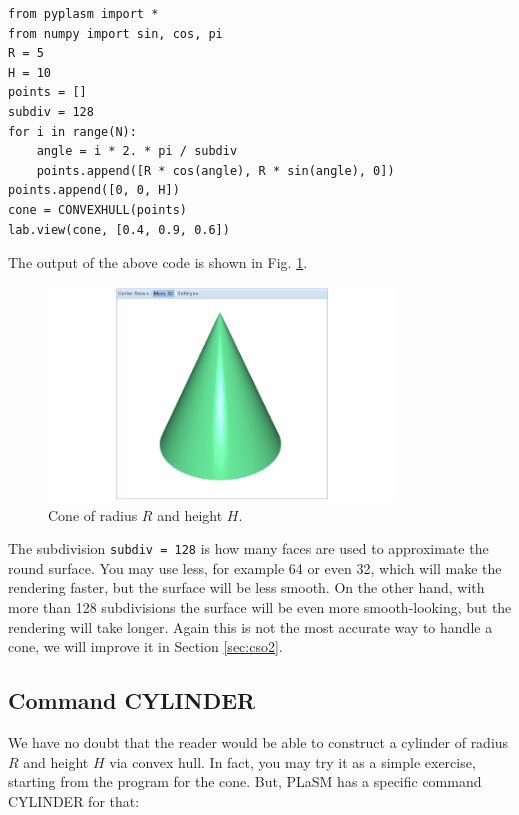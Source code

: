 \documentclass[article,A4,12pt]{llncs}
\begin{document}
{\small
\begin{verbatim}
from pyplasm import *
from numpy import sin, cos, pi
R = 5
H = 10
points = []
subdiv = 128
for i in range(N):
    angle = i * 2. * pi / subdiv
    points.append([R * cos(angle), R * sin(angle), 0])
points.append([0, 0, H])
cone = CONVEXHULL(points)
lab.view(cone, [0.4, 0.9, 0.6])
\end{verbatim}
}
\noindent
The output of the above code is shown in Fig. \ref{fig:convexhull-2}.

\begin{figure}[!ht]
\begin{center}
\includegraphics[width=0.82\textwidth]{img/convexhull-2.png}
\end{center}
\vspace{-2mm}
\caption{Cone of radius $R$ and height $H$.}
\label{fig:convexhull-2}
\end{figure}

The subdivision {\tt subdiv = 128} is how many
faces are used to approximate the round surface. You may use less, 
for example 64 or even 32, which will make the rendering faster, but
the surface will be less smooth. On the other hand, with more than 
128 subdivisions the surface will be even more smooth-looking, but 
the rendering will take longer. Again this is not the most accurate 
way to handle a cone, we will improve it in Section \ref{sec:cso2}.

\subsection{Command CYLINDER}

We have no doubt that the reader would be able to construct 
a cylinder of radius $R$ and height $H$ via convex hull. 
In fact, you may try it as a simple exercise, starting from 
the program for the cone. But, PLaSM has a specific command
CYLINDER for that:
\end{document}
